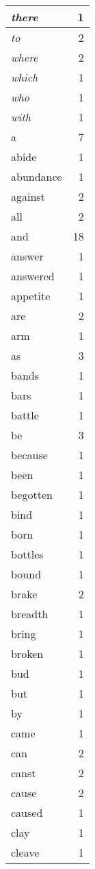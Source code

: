 \begin{center}
\begin{longtable}{l|r}
\emph{there} & 1 \\ \hline
\emph{to} & 2 \\ \hline
\emph{where} & 2 \\ \hline
\emph{which} & 1 \\ \hline
\emph{who} & 1 \\ \hline
\emph{with} & 1 \\ \hline
a & 7 \\ \hline
abide & 1 \\ \hline
abundance & 1 \\ \hline
against & 2 \\ \hline
all & 2 \\ \hline
and & 18 \\ \hline
answer & 1 \\ \hline
answered & 1 \\ \hline
appetite & 1 \\ \hline
are & 2 \\ \hline
arm & 1 \\ \hline
as & 3 \\ \hline
bands & 1 \\ \hline
bars & 1 \\ \hline
battle & 1 \\ \hline
be & 3 \\ \hline
because & 1 \\ \hline
been & 1 \\ \hline
begotten & 1 \\ \hline
bind & 1 \\ \hline
born & 1 \\ \hline
bottles & 1 \\ \hline
bound & 1 \\ \hline
brake & 2 \\ \hline
breadth & 1 \\ \hline
bring & 1 \\ \hline
broken & 1 \\ \hline
bud & 1 \\ \hline
but & 1 \\ \hline
by & 1 \\ \hline
came & 1 \\ \hline
can & 2 \\ \hline
canst & 2 \\ \hline
cause & 2 \\ \hline
caused & 1 \\ \hline
clay & 1 \\ \hline
cleave & 1 \\ \hline

\end{longtable}
\end{center}
